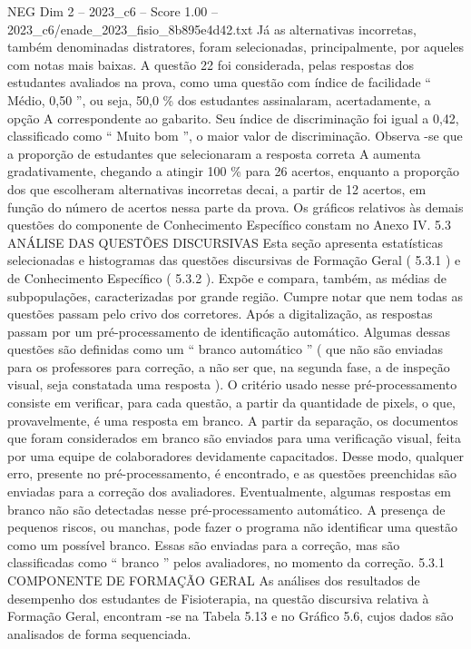\begin{textsample}{NEG Dim 2 – 2023\_c6 – Score 1.00 – 2023\_c6/enade\_2023\_fisio\_8b895e4d42.txt}
Já as alternativas incorretas, também denominadas distratores, foram selecionadas, principalmente, por aqueles com notas mais baixas.
A questão 22 foi considerada, pelas respostas dos estudantes avaliados na prova, como uma questão com índice de facilidade “ Médio, 0,50 ”, ou seja, 50,0 \% dos estudantes assinalaram, acertadamente, a opção A correspondente ao gabarito.
Seu índice de discriminação foi igual a 0,42, classificado como “ Muito bom ”, o maior valor de discriminação.
Observa -se que a proporção de estudantes que selecionaram a resposta correta A aumenta gradativamente, chegando a atingir 100 \% para 26 acertos, enquanto a proporção dos que escolheram alternativas incorretas decai, a partir de 12 acertos, em função do número de acertos nessa parte da prova.
Os gráficos relativos às demais questões do componente de Conhecimento Específico constam no Anexo IV. 5.3 ANÁLISE DAS QUESTÕES DISCURSIVAS Esta seção apresenta estatísticas selecionadas e histogramas das questões discursivas de Formação Geral ( 5.3.1 ) e de Conhecimento Específico ( 5.3.2 ).
Expõe e compara, também, as médias de subpopulações, caracterizadas por grande região.
Cumpre notar que nem todas as questões passam pelo crivo dos corretores.
Após a digitalização, as respostas passam por um pré-processamento de identificação automático.
Algumas dessas questões são definidas como um “ branco automático ” ( que não são enviadas para os professores para correção, a não ser que, na segunda fase, a de inspeção visual, seja constatada uma resposta ).
O critério usado nesse pré-processamento consiste em verificar, para cada questão, a partir da quantidade de pixels, o que, provavelmente, é uma resposta em branco.
A partir da separação, os documentos que foram considerados em branco são enviados para uma verificação visual, feita por uma equipe de colaboradores devidamente capacitados.
Desse modo, qualquer erro, presente no pré-processamento, é encontrado, e as questões preenchidas são enviadas para a correção dos avaliadores.
Eventualmente, algumas respostas em branco não são detectadas nesse pré-processamento automático.
A presença de pequenos riscos, ou manchas, pode fazer o programa não identificar uma questão como um possível branco.
Essas são enviadas para a correção, mas são classificadas como “ branco ” pelos avaliadores, no momento da correção. 5.3.1 COMPONENTE DE FORMAÇÃO GERAL As análises dos resultados de desempenho dos estudantes de Fisioterapia, na questão discursiva relativa à Formação Geral, encontram -se na Tabela 5.13 e no Gráfico 5.6, cujos dados são analisados de forma sequenciada.

\end{textsample}

